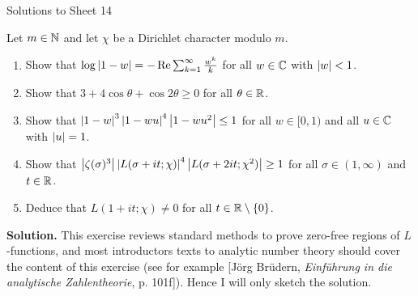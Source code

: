\documentclass[a4paper,11pt]{article}
\begin{document}
\begin{center}
    \huge{Solutions to Sheet 14}
\end{center}

Let $m \in \mathbb{N}$ and let $\chi$ be a Dirichlet character modulo $m$.
\begin{enumerate}
    \item Show that $\log \left\lvert 1-w \right\rvert = - \operatorname{Re} \sum_{k=1}^\infty \frac{w^k}k$ 
        for all $w \in \mathbb{C}$ with $\left\lvert w \right\rvert < 1$. 
    \item Show that $3 + 4\cos \theta + \cos 2 \theta \geq 0$ for all 
        $\theta \in \mathbb{R}$.
    \item Show that $\left\lvert 1-w \right\rvert^3\left\lvert 1-wu \right\rvert^4\left\lvert 1-wu^2 \right\rvert\leq 1$ for all $w \in [0,1)$
        and all $u \in \mathbb{C}$ with $\left\lvert u \right\rvert = 1$.
    \item Show that $\left\lvert \zeta(\sigma)^3 \right\rvert\left\lvert L(\sigma + it; \chi) \right\rvert^4 
        \left\lvert L(\sigma + 2it;\chi^2) \right\rvert \geq 1$ for all $\sigma \in (1, \infty)$
        and $t \in \mathbb{R}$.
    \item Deduce that $L(1+it; \chi) \neq 0$ for all $t \in \mathbb{R}\setminus \{0\}$.
\end{enumerate}
\textbf{Solution.}
This exercise reviews standard methods to prove zero-free regions of $L$-functions, and
most introductors texts to analytic number theory should cover the content of this 
exercise (see for example [Jörg Brüdern, \textit{Einführung in die analytische Zahlentheorie}, p. 101f]). Hence I will only sketch the solution.
\end{document}
